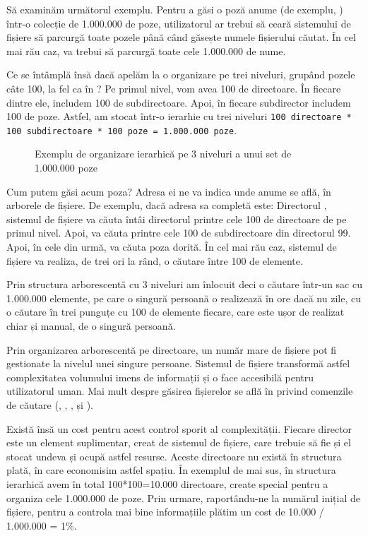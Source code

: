 Să examinăm următorul exemplu.
Pentru a găsi o poză anume (de exemplu, ) într-o colecție de 1.000.000 de poze, utilizatorul ar trebui să ceară sistemului de fișiere să parcurgă toate pozele până când găsește numele fișierului căutat.
În cel mai rău caz, va trebui să parcurgă toate cele 1.000.000 de nume.

Ce se întâmplă însă dacă apelăm la o organizare pe trei niveluri, grupând pozele câte 100, la fel ca în ? Pe primul nivel, vom avea 100 de directoare.
În fiecare dintre ele, includem 100 de subdirectoare.
Apoi, în fiecare subdirector includem 100 de poze.
Astfel, am stocat într-o ierarhie cu trei niveluri \texttt{100 directoare * 100 subdirectoare * 100 poze = 1.000.000 poze}.

\begin{figure}[htbp]
  \centering
  \def\svgwidth{\columnwidth}
  
  \caption{Exemplu de organizare ierarhică pe 3 niveluri a unui set de 1.000.000 poze}
  \label{fig:fs:ex-3-lvl}
\end{figure}

Cum putem găsi acum poza? Adresa ei ne va indica unde anume se află, în arborele de fișiere.
De exemplu, dacă adresa sa completă este: Directorul , sistemul de fișiere va căuta întâi directorul  printre cele 100 de directoare de pe primul nivel.
Apoi, va căuta  printre cele 100 de subdirectoare din directorul 99.
 Apoi, în cele din urmă, va căuta poza dorită.
În cel mai rău caz, sistemul de fișiere va realiza, de trei ori la rând, o căutare între 100 de elemente.

Prin structura arborescentă cu 3 niveluri am înlocuit deci o căutare într-un sac cu 1.000.000 elemente, pe care o singură persoană o realizează în ore dacă nu zile, cu o căutare în trei punguțe cu 100 de elemente fiecare, care este ușor de realizat chiar și manual, de o singură persoană.

Prin organizarea arborescentă pe directoare, un număr mare de fișiere pot fi gestionate la nivelul unei singure persoane.
Sistemul de fișiere transformă astfel complexitatea volumului imens de informații și o face accesibilă pentru utilizatorul uman.
Mai mult despre găsirea fișierelor se află în  privind comenzile de căutare (, , ,  și ).

Există însă un cost pentru acest control sporit al complexității.
Fiecare director este un element suplimentar, creat de sistemul de fișiere, care trebuie să fie și el stocat undeva și ocupă astfel resurse.
Aceste directoare nu există în structura plată, în care economisim astfel spațiu.
În exemplul de mai sus, în structura ierarhică avem în total 100*100=10.000 directoare, create special pentru a organiza cele 1.000.000 de poze.
Prin urmare, raportându-ne la numărul inițial de fișiere, pentru a controla mai bine informațiile plătim un cost de 10.000 / 1.000.000 = 1\%.

